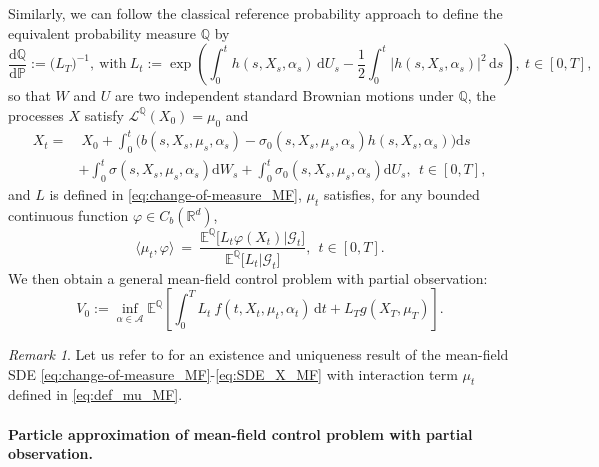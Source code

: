 \documentclass[11pt]{article}
\numberwithin{equation}{section}
\theoremstyle{plain}
\theoremstyle{definition}
\theoremstyle{remark}
\newtheorem{remark}[theorem]{Remark}
\newcommand{\Q}{\mathbb{Q}}
\newcommand{\R}{\mathbb{R}}
\newcommand{\dd}{\mathrm{d}}
\newcommand{\Gc}{\mathcal{G}}
\begin{document}
	Similarly, we can follow the classical reference probability approach to define the equivalent probability measure $\mathbb{Q}$  by 
	\begin{equation} \label{eq:change-of-measure_MF}
		\frac{\dd \mathbb{Q}}{\dd \mathbb{P}}
		:= \big(L_T \big)^{-1}, 
		~\mbox{with}~
		L_t:= \exp\left( \int_0^t h(s,X_s, \alpha_s)\,\dd U_s - \frac{1}{2}\int_0^t \big| h(s, X_s, \alpha_s) \big|^2\,\dd s\right),
		~t \in [0,T],
	\end{equation}
	so that  $W$ and $U$ are two independent standard Brownian motions under $\mathbb{Q}$,
	the processes $X$ satisfy $\mathcal{L}^{\Q} (X_0) = \mu_0$ and
	\begin{align} \label{eq:SDE_X_MF}
		X_t 
		=&~
		X_0 
		+
		\int_0^t \big(b(s, X_s, \mu_s, \alpha_s) - \sigma_0(s, X_s, \mu_s, \alpha_s) h(s,X_s, \alpha_s) \big) \dd s \nonumber \\
		& +
		\int_0^t \sigma(s, X_s,  \mu_s, \alpha_s)\dd W_s 
		+ 
		\int_0^t \sigma_0(s, X_s, \mu_s, \alpha_s)\dd U_s, 
		~~t \in [0,T],
	\end{align}
	and $L$ is defined in \eqref{eq:change-of-measure_MF}, $\mu_t$ satisfies, for any bounded continuous function $\varphi \in C_b( \R^d)$,
	\begin{equation} \label{eq:def_mu_MF}
		\big\langle \mu_t, \varphi \big \rangle 
		~=~
		\frac{\mathbb{E}^{\mathbb{Q}} \big [L_t \varphi(X_t ) \big| \Gc_t \big]}{\mathbb{E}^{\mathbb{Q}} \big[L_t \big| \Gc_t \big]},
		~~t \in [0,T].
	\end{equation}
	We then obtain a general mean-field control problem with partial observation:
	\begin{equation} \label{eq:reform_V0_MF}
		V_0 
		:=
		\inf_{\alpha \in \mathcal{A}} 
		\mathbb{E}^{\mathbb{Q}} 
		\left[ 
		\int_0^T L_t ~f(t, X_t, \mu_t, \alpha_t)\,\dd t 
		+
		L_T g(X_T, \mu_T) 
		\right]. 
	\end{equation}
	
	\begin{remark}
		Let us refer to \cite{buckdahn2023general} for an existence and uniqueness result of the mean-field SDE \eqref{eq:change-of-measure_MF}-\eqref{eq:SDE_X_MF} with interaction term $\mu_t$ defined in \eqref{eq:def_mu_MF}.
	\end{remark}
	
	\paragraph{Particle approximation of mean-field control problem with partial observation.}
	
\end{document}
